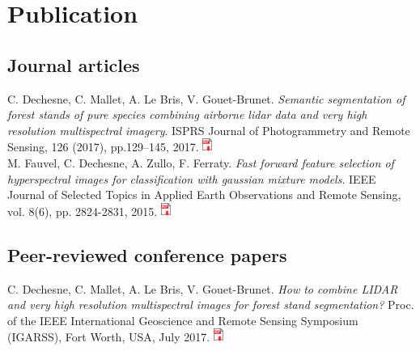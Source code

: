 
\chapter{Publication} %

\label{Publication} %

\startcontents[chapters]
\Mprintcontents


\section{Journal articles}

C. Dechesne, C. Mallet, A. Le Bris, V. Gouet-Brunet. \textit{Semantic segmentation of forest stands of pure species combining airborne lidar data and very high resolution multispectral imagery}. ISPRS Journal of Photogrammetry and Remote Sensing, 126 (2017), pp.129–145, 2017. \href{http://recherche.ign.fr/labos/matis/pdf/articles_revues/2017/semantic_segmentation.pdf}{\includegraphics[height=12pt]{Appendices/ic_pdf.jpg}} \\

M. Fauvel, C. Dechesne, A. Zullo, F. Ferraty. \textit{Fast forward feature selection of hyperspectral images for classification with gaussian mixture models}. IEEE Journal of Selected Topics in Applied Earth Observations and Remote Sensing, vol. 8(6), pp. 2824-2831, 2015. \href{https://arxiv.org/pdf/1501.00857v1.pdf}{\includegraphics[height=12pt]{Appendices/ic_pdf.jpg}} \\

\section{Peer-reviewed conference papers}

C. Dechesne, C. Mallet, A. Le Bris, V. Gouet-Brunet. \textit{How to combine LIDAR and very high resolution multispectral images for forest stand segmentation?} Proc. of the IEEE International Geoscience and Remote Sensing Symposium (IGARSS), Fort Worth, USA, July 2017. \href{http://recherche.ign.fr/labos/matis/pdf/articles_conf/2017/IGARSS_2017_Dechesne_Clement_final.pdf}{\includegraphics[height=12pt]{Appendices/ic_pdf.jpg}} \\

